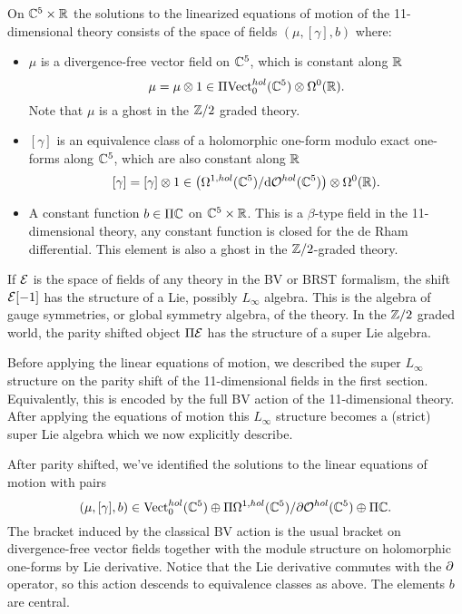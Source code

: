 \documentclass[11pt]{amsart}
\begin{document}
\parsec[]

On $\mathbb C^5 \times \mathbb R$ the solutions to the linearized equations of motion of the 11-dimensional theory consists of the space of fields $(\mu, [\gamma], b)$ where:
\begin{itemize}
\item $\mu$ is a divergence-free vector field on $\mathbb C^5$, which is constant along $\mathbb R$
\[
\mu = \mu \otimes 1 \in \Pi {\rm Vect}^{hol}_0(\mathbb C^5) \otimes \Omega^0(\mathbb R) .
\]
Note that $\mu$ is a ghost in the $\mathbb Z/2$ graded theory. 
\item $[\gamma]$ is an equivalence class of a holomorphic one-form modulo exact one-forms along $\mathbb C^5$, which are also constant along $\mathbb R$
\[
[\gamma] = [\gamma] \otimes 1 \in \left(\Omega^{1,hol}(\mathbb C^5) / {\rm d} \mathcal O^{hol}(\mathbb C^5) \right) \otimes \Omega^0(\mathbb R) .
\]
\item A constant function $b \in \Pi \mathbb C$ on $\mathbb C^5 \times \mathbb R$.
This is a $\beta$-type field in the 11-dimensional theory, any constant function is closed for the de Rham differential. 
This element is also a ghost in the $\mathbb Z/2$-graded theory. 
\end{itemize}

\parsec[]

If $\mathcal E$ is the space of fields of any theory in the BV or BRST formalism, the shift $\mathcal E[-1]$ has the structure of a Lie, possibly $L_\infty$ algebra. 
This is the algebra of gauge symmetries, or global symmetry algebra, of the theory. 
In the $\mathbb Z/2$ graded world, the parity shifted object $\Pi \mathcal E$ has the structure of a super Lie algebra. 

Before applying the linear equations of motion, we described the super $L_\infty$ structure on the parity shift of the 11-dimensional fields in the first section. 
Equivalently, this is encoded by the full BV action of the 11-dimensional theory. 
After applying the equations of motion this $L_\infty$ structure becomes a (strict) super Lie algebra which we now explicitly describe.

After parity shifted, we've identified the solutions to the linear equations of motion with pairs
\[
(\mu, [\gamma], b) \in {\rm Vect}^{hol}_0(\mathbb C^5) \oplus \Pi \Omega^{1,hol}(\mathbb C^5) / \partial \mathcal O^{hol}(\mathbb C^5) \oplus \Pi \mathbb C .
\]
The bracket induced by the classical BV action is the usual bracket on divergence-free vector fields together with the module structure on holomorphic one-forms by Lie derivative.
Notice that the Lie derivative commutes with the $\partial$ operator, so this action descends to equivalence classes as above. 
The elements $b$ are central. 
\end{document}
